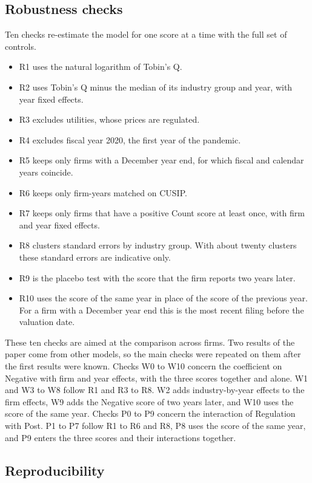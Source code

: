 \documentclass[12pt,a4paper]{article}
\begin{document}
\subsection{Robustness checks}

Ten checks re-estimate the model for one score at a time with the full set of controls.

\begin{itemize}
\item R1 uses the natural logarithm of Tobin's Q.
\item R2 uses Tobin's Q minus the median of its industry group and year, with year fixed effects.
\item R3 excludes utilities, whose prices are regulated.
\item R4 excludes fiscal year 2020, the first year of the pandemic.
\item R5 keeps only firms with a December year end, for which fiscal and calendar years coincide.
\item R6 keeps only firm-years matched on CUSIP.
\item R7 keeps only firms that have a positive Count score at least once, with firm and year fixed effects.
\item R8 clusters standard errors by industry group. With about twenty clusters these standard errors are indicative only.
\item R9 is the placebo test with the score that the firm reports two years later.
\item R10 uses the score of the same year in place of the score of the previous year. For a firm with a December year end this is the most recent filing before the valuation date.
\end{itemize}

These ten checks are aimed at the comparison across firms. Two results of the paper come from other models, so the main checks were repeated on them after the first results were known. Checks W0 to W10 concern the coefficient on Negative with firm and year effects, with the three scores together and alone. W1 and W3 to W8 follow R1 and R3 to R8. W2 adds industry-by-year effects to the firm effects, W9 adds the Negative score of two years later, and W10 uses the score of the same year. Checks P0 to P9 concern the interaction of Regulation with Post. P1 to P7 follow R1 to R6 and R8, P8 uses the score of the same year, and P9 enters the three scores and their interactions together.

\subsection{Reproducibility}
\end{document}
